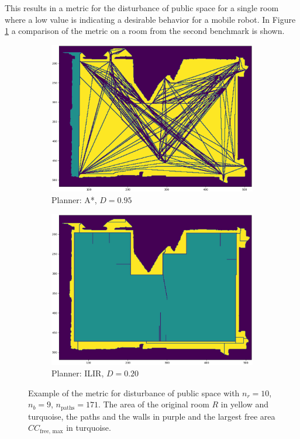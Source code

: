 This results in a metric for the disturbance of public space for a single room where a low value is indicating a desirable behavior for a mobile robot. In Figure \ref{fig:disturbance_example} a comparison of the metric on a room from the second benchmark is shown.

\begin{figure}[h]
    \captionsetup[subfigure]{justification=centering}
    \centering
    \begin{subfigure}{.5\textwidth}
      \centering
      \includegraphics[width=\textwidth]{figures/30_methods/room9_disturbance_astar_smooth.png}
      \caption{Planner: A*, \(D = 0.95\)}
    \end{subfigure}%
    \begin{subfigure}{.5\textwidth}
      \centering
      \includegraphics[width=.975\textwidth]{figures/30_methods/room9_disturbance_ilir_smooth.png}
      \caption{Planner: ILIR, \(D = 0.20\)}
    \end{subfigure}
    \caption[Example of the metric for disturbance of public space]{Example of the metric for disturbance of public space with \(n_r=10\), \(n_b=9\), \(n_{\text{paths}}=171\). The area of the original room \(R\) in yellow and turquoise, the paths and the walls in purple and the largest free area \(CC_{\text{free, max}}\) in turquoise.}
    \label{fig:disturbance_example}
\end{figure}


